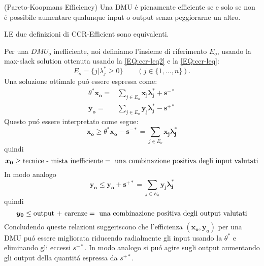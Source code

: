 \begin{definiz} (Pareto-Koopmans Efficiency) Una DMU \'e pienamente efficiente se e solo se non \'e possibile aumentare qualunque input o output senza peggiorarne un altro.
\end{definiz} 
\begin{teor} LE due definizioni di CCR-Efficient sono equivalenti.
\end{teor}
\begin{oss} Per una $DMU_{o}$ inefficiente, noi definiamo l'insieme di riferimento $E_{o}$, usando la max-slack solution ottenuta usando la \ref{EQ:ccr-leq2} e la \ref{EQ:ccr-leq}:
\begin{equation} \label{eq:insieme riferimento}
E_{o} = \lbrace j| \lambda_{j}^* \geq 0\rbrace \qquad (j\in \lbrace1, \dots, n\rbrace).
\end{equation}
Una soluzione ottimale pu\'o essere espressa come:
\begin{equation}
\begin{split}
\theta^*\boldsymbol{x_{o}} = & \sum_{j \in E_{o}} \boldsymbol{x_{j}\lambda^*_{j} + s^{-*}} \\
\boldsymbol{y_{o}} = & \sum_{j \in E_{o}} \boldsymbol{y_{j}\lambda^*_{j} - s^{+*}}
\end{split}
\end{equation}
Questo pu\'o essere interpretato come segue:
\begin{equation}
\boldsymbol{x_{o}} \geq \theta^* \boldsymbol{x_{o} - s^{-*}} = \sum_{j \in E_{o}} \boldsymbol{x_{j}\lambda^*_{j}}
\end{equation}
quindi
\begin{equation}
\boldsymbol{x_0} \geq \text{tecnice - mista inefficiente} \\
= \text{ una combinazione positiva degli input valutati}
\end{equation}
In modo analogo 
\begin{equation}
\boldsymbol{y_{o}} \leq \boldsymbol{y_{o} + s^{+*}} = \sum_{j \in E_{o}} \boldsymbol{y_{j}\lambda^*_{j}}
\end{equation}
quindi
\begin{equation}
\boldsymbol{y_0} \leq \text{output + carenze} \\
= \text{ una combinazione positiva degli output valutati}
\end{equation}
Concludendo queste relazioni suggeriscono che l'efficienza $(\boldsymbol{x_{o}, y_{o}})$ per una DMU pu\'o essere migliorata riducendo radialmente gli input usando la $\theta^*$ e eliminando gli eccessi $s^{-*}$. In modo analogo si pu\'o agire sugli output aumentando gli output della quantit\'a espressa da $s^{+*}$.
\end{oss}
